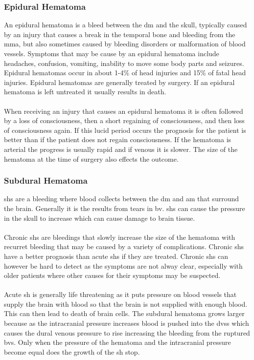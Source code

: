 \documentclass[11pt]{article}
\begin{document}
\subsubsection{Epidural Hematoma}
An epidural hematoma is a bleed between the \gls{dm} and the skull, typically caused by an injury that causes a break in the temporal bone and bleeding from the \gls{mma}, but also sometimes caused by bleeding disorders or malformation of blood vessels. Symptoms that may be cause by an epidural hematoma include headaches, confusion, vomiting, inability to move some body parts and seizures. Epidural hematomas occur in about 1-4\% of head injuries and 15\% of fatal head injuries. Epidural hematomas are generally treated by surgery. If an epidural hematoma is left untreated it usually results in death.\cite{EpiduralHematoma2021}\\
\\
When receiving an injury that causes an epidural hematoma it is often followed by a loss of consciousness, then a short regaining of consciousness, and then loss of consciousness again. If this lucid period occurs the prognosis for the patient is better than if the patient does not regain consciousness. If the hematoma is arterial the progress is usually rapid and if venous it is slower. The size of the hematoma at the time of surgery also effects the outcome.\cite{EpiduralHematoma2021}

\subsubsection{Subdural Hematoma}
\glspl{sh} are a bleeding where blood collects between the \gls{dm} and \gls{am} that surround the brain. Generally it is the results from tears in \gls{bv}. \gls{sh}s can cause the pressure in the skull to increase which can cause damage to brain tissue.\cite{SubduralHematoma2021}\\
\\
Chronic \glspl{sh} are bleedings that slowly increase the size of the hematoma with recurret bleeding that may be caused by a variety of complications\cite{yadavChronicSubduralHematoma2016}. Chronic \glspl{sh} have a better prognosis than acute \glspl{sh} if they are treated. Chronic \glspl{sh} can however be hard to detect as the symptoms are not alway clear, especially with older patients where other causes for their symptoms may be suspected\cite{yadavChronicSubduralHematoma2016}.\cite{SubduralHematoma2021}\\
\\
Acute \gls{sh} is generally life threatening as it puts pressure on blood vessels that supply the brain with blood so that the brain is not supplied with enough blood. This can then lead to death of brain cells. The subdural hematoma grows larger because as the intracranial pressure increases blood is pushed into the \glspl{dvs} which causes the dural venous pressure to rise increasing the bleeding from the ruptured \glspl{bv}. Only when the pressure of the hematoma and the intracranial pressure become equal does the growth of the \gls{sh} stop.\cite{SubduralHematoma2021}
\end{document}
